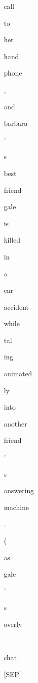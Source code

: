 \documentclass[varwidth=150mm]{standalone}
\begin{document}
\begin{CJK*}{UTF8}{gbsn}
{{{\colorbox{red!1.2421529293060303}{\strut call} \colorbox{red!0.0}{\strut to} \colorbox{red!0.0}{\strut her} \colorbox{red!0.0}{\strut hand}\colorbox{red!2.6368610858917236}{\strut phone} \colorbox{red!1.0237325429916382}{\strut ,} \colorbox{red!24.923295974731445}{\strut and} \colorbox{red!25.43073272705078}{\strut barbara} \colorbox{red!2.803972005844116}{\strut '} \colorbox{red!2.4919798374176025}{\strut s} \colorbox{red!7.296084403991699}{\strut best} \colorbox{red!5.384850978851318}{\strut friend} \colorbox{red!19.089946746826172}{\strut gale} \colorbox{red!14.413642883300781}{\strut is} \colorbox{red!24.666690826416016}{\strut killed} \colorbox{red!1.344959020614624}{\strut in} \colorbox{red!2.8854479789733887}{\strut a} \colorbox{red!10.55652904510498}{\strut car} \colorbox{red!11.086749076843262}{\strut accident} \colorbox{red!3.871739149093628}{\strut while} \colorbox{red!6.934346675872803}{\strut tal}\colorbox{red!1.8611178398132324}{\strut ing} \colorbox{red!29.121992111206055}{\strut animated}\colorbox{red!6.645561218261719}{\strut ly} \colorbox{red!0.0}{\strut into} \colorbox{red!1.057848572731018}{\strut another} \colorbox{red!4.849775791168213}{\strut friend} \colorbox{red!3.2894654273986816}{\strut '} \colorbox{red!1.7548604011535645}{\strut s} \colorbox{red!3.63444185256958}{\strut answering} \colorbox{red!5.392974853515625}{\strut machine} \colorbox{red!0.0}{\strut .} \colorbox{red!19.9344539642334}{\strut (} \colorbox{red!15.034106254577637}{\strut as} \colorbox{red!27.97140884399414}{\strut gale} \colorbox{red!1.7401158809661865}{\strut '} \colorbox{red!2.050776243209839}{\strut s} \colorbox{red!3.1117618083953857}{\strut overly} \colorbox{red!4.940576076507568}{\strut -} \colorbox{red!7.261647701263428}{\strut chat} \colorbox{red!1.7505651712417603}{\strut [SEP]}
}}}
\end{CJK*}
\end{document}
